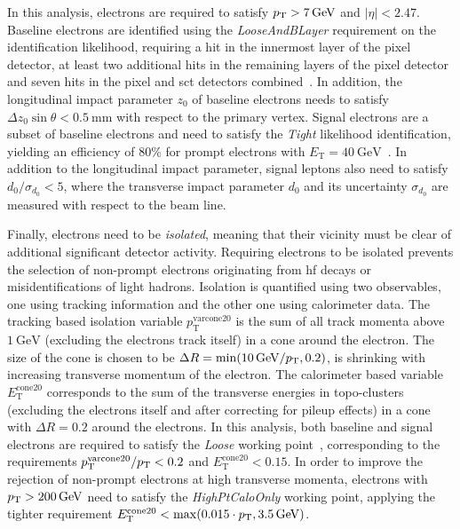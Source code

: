In this analysis, electrons are required to satisfy $p_{\textrm{T}} > \SI{7}{GeV}$ and $\vert\eta\vert<2.47$. Baseline electrons are identified using the \textit{LooseAndBLayer} requirement on the identification likelihood, requiring a hit in the innermost layer of the pixel detector, at least two additional hits in the remaining layers of the pixel detector and seven hits in the pixel and \gls{sct} detectors combined~\cite{PERF-2017-01}. In addition, the longitudinal impact parameter $z_0$ of baseline electrons needs to satisfy $\Delta z_0\sin\theta < \SI{0.5}{\milli\meter}$ with respect to the primary vertex. Signal electrons are a subset of baseline electrons and need to satisfy the \textit{Tight} likelihood identification, yielding an efficiency of 80\% for prompt electrons with $E_\mathrm{T}=\SI{40}{\GeV}$~\cite{PERF-2017-01}. In addition to the longitudinal impact parameter, signal leptons also need to satisfy $d_0/\sigma_{d_0} < 5$, where the transverse impact parameter $d_0$ and its uncertainty $\sigma_{d_0}$ are measured with respect to the beam line. 

Finally, electrons need to be \textit{isolated}, meaning that their vicinity must be clear of additional significant detector activity. Requiring electrons to be isolated prevents the selection of non-prompt electrons originating \eg from \gls{hf} decays or misidentifications of light hadrons. Isolation is quantified using two observables, one using tracking information and the other one using calorimeter data. The tracking based isolation variable $p_{\mathrm{T}}^{\mathrm{varcone20}}$ is the sum of all track momenta above $\SI{1}{\GeV}$ (excluding the electrons track itself) in a cone around the electron. The size of the cone is chosen to be $\Delta R = \min (\SI{10}{\GeV}/\pt,0.2)$, \ie is shrinking with increasing transverse momentum of the electron. The calorimeter based variable $E_{\mathrm{T}}^{\mathrm{cone20}}$ corresponds to the sum of the transverse energies in topo-clusters (excluding the electrons itself and after correcting for pileup effects) in a cone with $\Delta R = 0.2$ around the electrons. In this analysis, both baseline and signal electrons are required to satisfy the \textit{Loose} working point~\cite{EGAM-2018-01}, corresponding to the requirements $p_{\mathrm{T}}^{\mathrm{varcone20}}/p_{\textrm{T}} < 0.2$ and $E_{\mathrm{T}}^{\mathrm{cone20}} < 0.15$. In order to improve the rejection of non-prompt electrons at high transverse momenta, electrons with $\pt >\SI{200}{\GeV}$ need to satisfy the \textit{HighPtCaloOnly} working point, applying the tighter requirement $E_{\mathrm{T}}^{\mathrm{cone20}} < \max (0.015\cdot\pt,\SI{3.5}{\GeV})$. 

